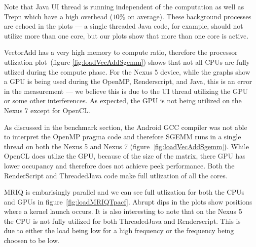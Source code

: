 Note that Java UI thread is running independent of the computation as well as Trepn which
  have a high overhead ($10\%$ on average).
These background processes are echoed in
  the plots --- a single threaded Java code, for example, should not utilize more than one core, but our plots show that more than one core is active.


VectorAdd has a very high memory to compute ratio, therefore the processor utlization
  plot~(figure \ref{fig:loadVecAddSgemm}) shows that not all CPUs 
  are fully utlized during the compute phase.
For the Nexus 5 device, while the graphs show a GPU is being used during the OpenMP,
  Renderscript, and Java, this is an error in the measurement --- we believe this is 
  due to the UI thread utilizing the GPU or some other interferences.
As expected, the GPU is not being utilized on the Nexus 7 except for OpenCL.

As discussed in the benchmark section, the Android GCC compiler was not able 
  to interpret the OpenMP pragma code and therefore SGEMM runs in a single thread
  on both the Nexus 5 and Nexus 7 (figure~\ref{fig:loadVecAddSgemm}).
While OpenCL does utlize the GPU, because of the size of the matrix, there GPU has
  lower occupancy and therefore does not achieve peek performance.
Both the RenderScript and ThreadedJava code make full utlization of all the cores.

MRIQ is embarisingly parallel and we can see full utlization for both the CPUs and GPUs in figure~\ref{fig:loadMRIQTpacf}.
Abrupt dips in the plots show positions where a kernel launch occurs.
It is also interesting to note that on the Nexus 5 the CPU is not fully utilized for both ThreadedJava and Renderscript.
This is due to either the load being low for a high frequency or the frequency being 
  choosen to be low.

